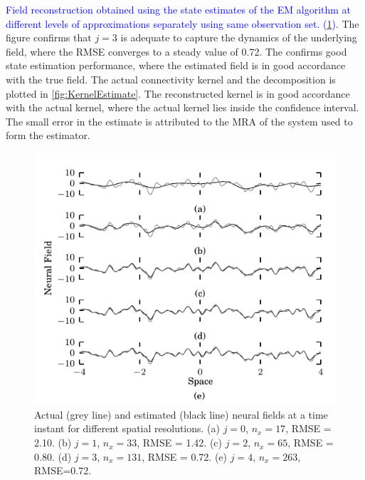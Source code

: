 \documentclass[journal,a4paper]{IEEEtran}
\newcommand{\parham}[1]{\textcolor{blue}{#1}}
\begin{document}
\parham{Field reconstruction obtained using the state estimates of the EM algorithm at different levels of approximations separately using same observation set. (\figurename{\ref{fig:FieldEstimates}})}. The figure confirms that $j=3$ is adequate to capture the dynamics of the underlying field, where the RMSE converges to a steady value of 0.72. The confirms good state estimation performance, where the estimated field is in good accordance with the true field. The actual connectivity kernel and the decomposition is plotted in \figurename{\ref{fig:KernelEstimate}}. The reconstructed kernel is in good accordance with the actual kernel, where the actual kernel lies inside the confidence interval. The small error in the estimate is attributed to the MRA of the system used to form the estimator.
\begin{figure}[!h] 
	\centering
		\includegraphics[scale=1]{./Graph/Field.pdf}
		\caption{Actual (grey line) and estimated (black line) neural fields at a time instant for different spatial resolutions. (a) $j=0$, $n_x=17$, RMSE = 2.10. (b) $j=1$, $n_x=33$, RMSE = 1.42. (c) $j=2$, $n_x=65$, RMSE = 0.80. (d) $j=3$, $n_x=131$, RMSE = 0.72. (e) $j=4$, $n_x=263$, RMSE=0.72.}
	\label{fig:FieldEstimates}
\end{figure} 
\end{document}
